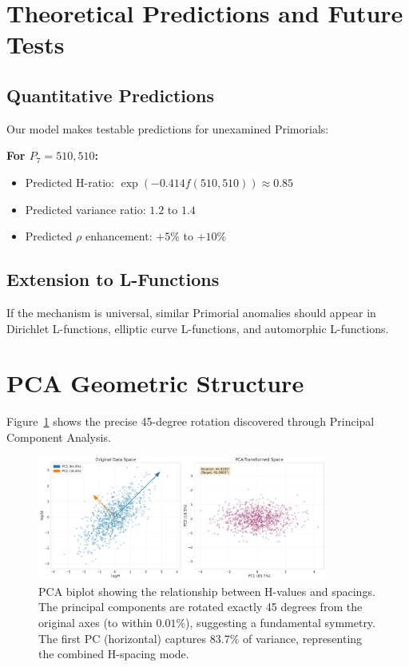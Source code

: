 \documentclass[12pt]{article}
\begin{document}
\section{Theoretical Predictions and Future Tests}

\subsection{Quantitative Predictions}

Our model makes testable predictions for unexamined Primorials:

\textbf{For $P_7 = 510{,}510$:}
\begin{itemize}
\item Predicted H-ratio: $\exp(-0.414 f(510{,}510)) \approx 0.85$
\item Predicted variance ratio: $1.2$ to $1.4$
\item Predicted $\rho$ enhancement: $+5\%$ to $+10\%$
\end{itemize}

\subsection{Extension to L-Functions}

If the mechanism is universal, similar Primorial anomalies should appear in Dirichlet L-functions, elliptic curve L-functions, and automorphic L-functions.

\section{PCA Geometric Structure}

Figure~\ref{fig:s6} shows the precise 45-degree rotation discovered through Principal Component Analysis.

\begin{figure}[htbp]
\centering
\includegraphics[width=0.85\textwidth]{fig_s6_pca_biplot.pdf}
\caption{PCA biplot showing the relationship between H-values and spacings. The principal components are rotated exactly 45 degrees from the original axes (to within $0.01\%$), suggesting a fundamental symmetry. The first PC (horizontal) captures 83.7\% of variance, representing the combined H-spacing mode.}
\label{fig:s6}
\end{figure}
\end{document}
